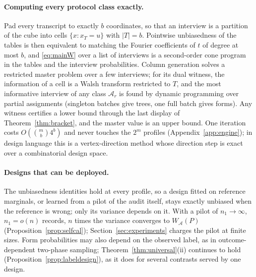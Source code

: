 \documentclass{article}
\newcommand{\A}{\mathcal A}
\begin{document}
\paragraph{Computing every protocol class exactly.}
Pad every transcript to exactly $b$ coordinates, so that an interview is a partition of the cube into cells $\{x:x_T=u\}$ with $|T|=b$. Pointwise unbiasedness of the tables is then equivalent to matching the Fourier coefficients of $t$ of degree at most $b$, and \eqref{eq:mainW} over a list of interviews is a second-order cone program in the tables and the interview probabilities. Column generation solves a restricted master problem over a few interviews; for its dual witness, the information of a cell is a Walsh transform restricted to $T$, and the most informative interview of any class $\A_r$ is found by dynamic programming over partial assignments (singleton batches give trees, one full batch gives forms). Any witness certifies a lower bound through the last display of Theorem~\ref{thm:bracket}, and the master value is an upper bound. One iteration costs $O(\binom mb4^b)$ and never touches the $2^m$ profiles (Appendix~\ref{app:engine}); in design language this is a vertex-direction method \citep{fedorov1972,wynn1970} whose direction step is exact over a combinatorial design space.

\paragraph{Designs that can be deployed.}
The unbiasedness identities hold at every profile, so a design fitted on reference marginals, or learned from a pilot of the audit itself, stays exactly unbiased when the reference is wrong; only its variance depends on it. With a pilot of $n_1\to\infty$, $n_1=o(n)$ records, $n$ times the variance converges to $W_\A(P)$ (Proposition~\ref{prop:selfcal}); Section~\ref{sec:experiments} charges the pilot at finite sizes. Form probabilities may also depend on the observed label, as in outcome-dependent two-phase sampling; Theorem~\ref{thm:universal}(ii) continues to hold (Proposition~\ref{prop:labeldesign}), as it does for several contrasts served by one design.
\end{document}
